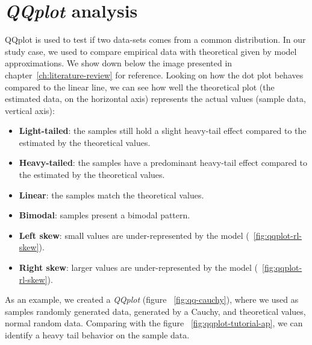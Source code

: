 \section{\textit{QQplot} analysis}

QQplot is used to test if two data-sets comes from a common distribution\cite{web-qqplot}\cite{paper-qqplot}\cite{web-qq-tuto1}\cite{web-qq-tuto2}. In our study case, we used to compare empirical data with theoretical given by model approximations. We show down below the image presented in chapter~\ref{ch:literature-review} for reference. 
Looking on how the dot plot behaves compared to the linear line, we can see how well the theoretical plot (the estimated data, on the horizontal axis) represents the actual values (sample data, vertical axis):

\begin{itemize}
\item \textbf{Light-tailed}: the samples still hold a slight heavy-tail effect compared to the estimated by the theoretical values.
\item \textbf{Heavy-tailed}: the samples have a predominant heavy-tail effect compared to the estimated by the theoretical values.
\item \textbf{Linear}: the samples match the theoretical values.
\item \textbf{Bimodal}: samples present a bimodal pattern.
\item \textbf{Left skew}: small values are under-represented by the model (~\ref{fig:qqplot-rl-skew}).
\item \textbf{Right skew}: larger values are under-represented by the model (~\ref{fig:qqplot-rl-skew}).
\end{itemize}



As an example, we created a \textit{QQplot} (figure ~\ref{fig:qq-cauchy}), where we used as samples randomly generated data, generated by a Cauchy, and theoretical values, normal random data. Comparing with the figure ~\ref{fig:qqplot-tutorial-ap}, we can identify a heavy tail behavior on the sample data.



